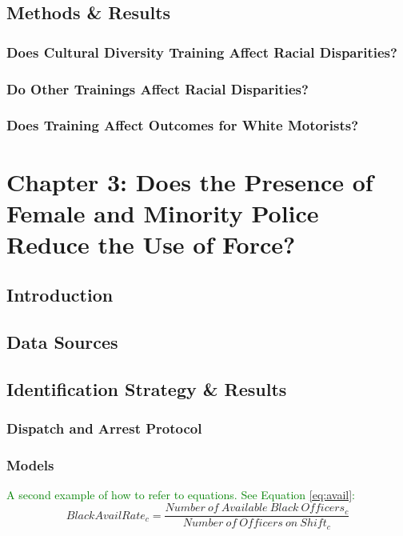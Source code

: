 \documentclass[12pt, letterpage]{article}
\begin{document}
\subsection{Methods \& Results}

\subsubsection{Does Cultural Diversity Training Affect Racial Disparities?}

\subsubsection{Do Other Trainings Affect Racial Disparities?}

\subsubsection{Does Training Affect Outcomes for White Motorists?}

\newpage


\setcounter{table}{0}
\setcounter{figure}{0}
\setcounter{footnote}{0}
\setcounter{equation}{0}

\section{Chapter 3: Does the Presence of Female and Minority Police Reduce the Use of Force?}

\subsection{Introduction}

\subsection{Data Sources}

\subsection{Identification Strategy \& Results}

\subsubsection{Dispatch and Arrest Protocol}

\subsubsection{Models}
\textcolor{green}{A second example of how to refer to equations. See Equation \eqref{eq:avail}:}
\begin{equation}
\label{eq:avail}
    BlackAvailRate_{c} = \frac{Number\ of\  Available\  Black\  Officers_c}{Number\ of\ Officers\ on\ Shift_c}
\end{equation}
\end{document}
